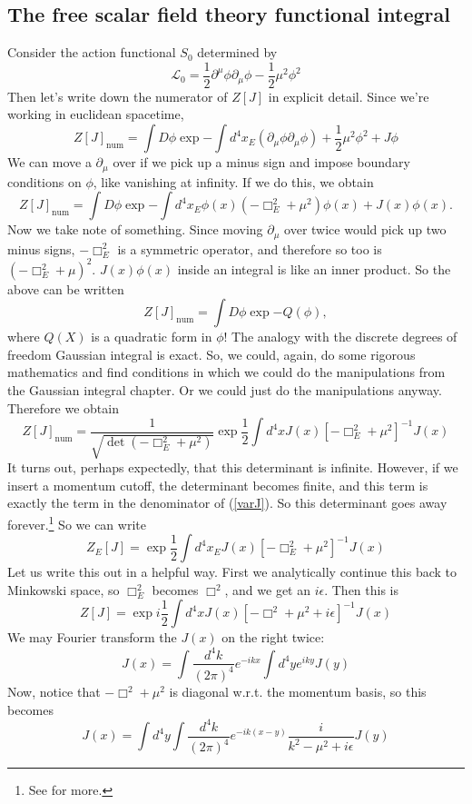 \documentclass[main.tex]{subfiles}
\begin{document}
\subsection{The free scalar field theory functional integral}
Consider the action functional $S_0$ determined by 
\[
\mathcal{L}_0 = \frac{1}{2} \partial^\mu \phi \partial_\mu \phi - \frac{1}{2} \mu^2 \phi^2
\]
Then let's write down the numerator of $Z[J]$ in explicit detail. Since we're working in euclidean spacetime,
\[
Z[J]_{\text{num}} = \int D \phi \exp{- \int d^4 x_E ( \partial_\mu \phi \partial_\mu \phi) + \frac{1}{2} \mu^2 \phi^2} + J\phi
\]
We can move a $\partial_\mu$ over if we pick up a minus sign and impose boundary conditions on $\phi$, like vanishing at infinity. If we do this, we obtain
\[
Z[J]_{\text{num}} =  \int D \phi \exp{ - \int d^4 x_E \phi(x) \left( 
-\Box^2_E + \mu^2
\right) \phi(x) + J(x) \phi(x)}.
\] 
Now we take note of something. Since moving $\partial_\mu$ over twice would pick up two minus signs, $-\Box_E^2$ is a symmetric operator, and therefore so too is $(-\Box_E^2 + \mu)^2$. $J(x) \phi(x)$ inside an integral is like an inner product. So the above can be written
\[
Z[J]_{\text{num}} = \int D \phi \exp{- Q(\phi)},
\]
where $Q(X)$ is a quadratic form in $\phi$! The analogy with the discrete degrees of freedom Gaussian integral is exact. So, we could, again, do some rigorous mathematics and find conditions in which we could do the manipulations from the Gaussian integral chapter. Or we could just do the manipulations anyway. Therefore we obtain
\[
Z[J]_{\text{num}} = \frac{1}{\sqrt{\det (-\Box_E^2 + \mu^2)}} \exp{\frac{1}{2}\int d^4 x J(x) [- \Box_E^2 + \mu^2]^{-1}  J(x)}
\]
It turns out, perhaps expectedly, that this determinant is infinite. However, if we insert a momentum cutoff, the determinant becomes finite, and this term is exactly the term in the denominator of (\ref{varJ}). So this determinant goes away forever.\footnote{See \cite{Co1} for more.} So we can write
\[
Z_E[J] = \exp{\frac{1}{2}\int d^4 x_E J(x) [-\Box_E^2 + \mu^2]^{-1} J(x)}
\]
Let us write this out in a helpful way. First we analytically continue this back to Minkowski space, so $\Box_E^2$ becomes $\Box^2$, and we get an $i \epsilon$. Then this is
\[
Z[J] = \exp{i \frac{1}{2} \int d^4 x J(x) [-\Box^2 + \mu^2 + i\epsilon]^{-1} J(x)}
\]
We may Fourier transform the $J(x)$ on the right twice:
\[
J(x) = \int \frac{d^4 k}{(2\pi)^4} e^{-ikx} \int d^4 y e^{iky} J(y)
\]
Now, notice that $-\Box^2 + \mu^2$ is diagonal w.r.t. the momentum basis, so this becomes
\[
J(x) = \int d^4 y \int \frac{d^4 k}{(2\pi)^4} e^{-ik(x-y)} \frac{i}{k^2 - \mu^2 + i \epsilon}
J(y)
\]
\end{document}
